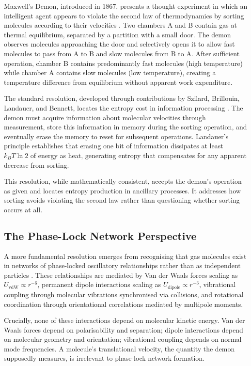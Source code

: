\documentclass[twocolumn,10pt,a4paper]{article}
\theoremstyle{definition}
\theoremstyle{remark}
\begin{document}
Maxwell's Demon, introduced in 1867, presents a thought experiment in which an intelligent agent appears to violate the second law of thermodynamics by sorting molecules according to their velocities \citep{maxwell1871}. Two chambers A and B contain gas at thermal equilibrium, separated by a partition with a small door. The demon observes molecules approaching the door and selectively opens it to allow fast molecules to pass from A to B and slow molecules from B to A. After sufficient operation, chamber B contains predominantly fast molecules (high temperature) while chamber A contains slow molecules (low temperature), creating a temperature difference from equilibrium without apparent work expenditure.

The standard resolution, developed through contributions by Szilard, Brillouin, Landauer, and Bennett, locates the entropy cost in information processing \citep{szilard1929, brillouin1951, landauer1961, bennett1982}. The demon must acquire information about molecular velocities through measurement, store this information in memory during the sorting operation, and eventually erase the memory to reset for subsequent operations. Landauer's principle establishes that erasing one bit of information dissipates at least $k_B T \ln 2$ of energy as heat, generating entropy that compensates for any apparent decrease from sorting.

This resolution, while mathematically consistent, accepts the demon's operation as given and locates entropy production in ancillary processes. It addresses how sorting avoids violating the second law rather than questioning whether sorting occurs at all.

\subsection{The Phase-Lock Network Perspective}

A more fundamental resolution emerges from recognising that gas molecules exist in networks of phase-locked oscillatory relationships rather than as independent particles \citep{sachikonye2024maxwell}. These relationships are mediated by Van der Waals forces scaling as $U_{\mathrm{vdW}} \propto r^{-6}$, permanent dipole interactions scaling as $U_{\mathrm{dipole}} \propto r^{-3}$, vibrational coupling through molecular vibrations synchronised via collisions, and rotational coordination through orientational correlations mediated by multipole moments.

Crucially, none of these interactions depend on molecular kinetic energy. Van der Waals forces depend on polarisability and separation; dipole interactions depend on molecular geometry and orientation; vibrational coupling depends on normal mode frequencies. A molecule's translational velocity, the quantity the demon supposedly measures, is irrelevant to phase-lock network formation.
\end{document}
